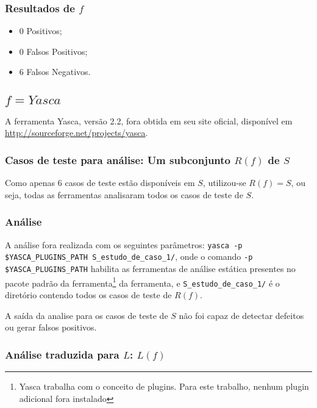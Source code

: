 \subsubsection{Resultados de $f$}

\begin{itemize}
  \item 0 Positivos;
  \item 0 Falsos Positivos;
  \item 6 Falsos Negativos.
\end{itemize}

\subsection{$f = Yasca$}

A ferramenta Yasca, versão 2.2, fora obtida em seu site oficial, disponível em \url{http://sourceforge.net/projects/yasca}.

\subsubsection{Casos de teste para análise: Um subconjunto $R(f)$ de $S$}

Como apenas 6 casos de teste estão disponíveis em $S$, utilizou-se $R(f) = S$, ou seja, todas as ferramentas analisaram todos os casos de teste de $S$.

\subsubsection{Análise}

A análise fora realizada com os seguintes parâmetros:
\lstinline[mathescape=false]{yasca -p $YASCA_PLUGINS_PATH S_estudo_de_caso_1/},
onde o comando \lstinline[mathescape=false]{-p $YASCA_PLUGINS_PATH} habilita as ferramentas de análise estática presentes no pacote padrão da ferramenta\footnote{Yasca trabalha com o conceito de plugins. Para este trabalho, nenhum plugin adicional fora instalado} da ferramenta, e \lstinline{S_estudo_de_caso_1/} é o diretório contendo todos os casos de teste de $R(f)$.

A saída da analise para os casos de teste de $S$ não foi capaz de detectar defeitos ou gerar falsos positivos.

\subsubsection{Análise traduzida para $L$: $L(f)$}

